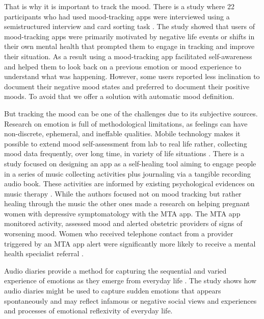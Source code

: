 That is why it is important to track the mood. There is a study where 22 participants who had used mood-tracking apps were interviewed using a semistructured interview and card sorting task \cite{schueller2021understanding}. The study showed that users of mood-tracking apps were primarily motivated by negative life events or shifts in their own mental health that prompted them to engage in tracking and improve their situation. As a result using a mood-tracking app facilitated self-awareness and helped them to look back on a previous emotion or mood experience to understand what was happening. However, some users reported less inclination to document their negative mood states and preferred to document their positive moods. To avoid that we offer a solution with automatic mood definition.

But tracking the mood can be one of the challenges due to its subjective sources. Research on emotion is full of methodological limitations, as feelings can have non-discrete, ephemeral, and ineffable qualities. Mobile technology makes it possible to extend mood self-assessment from lab to real life rather, collecting mood data frequently, over long time, in variety of life situations \cite{khue2015mood}. There is a study focused on designing an app as a self-healing tool aiming to engage people in a series of music collecting activities plus journaling via a tangible recording audio book. These activities are informed by existing psychological evidences on music therapy \cite{WOS:000723951900034}. While the authors focused not on mood tracking but rather healing through the music the other ones made a research on helping pregnant women with depressive symptomatology with the MTA app. The MTA app monitored activity, assessed mood and alerted obstetric providers of signs of worsening mood. Women who received telephone contact from a provider triggered by an MTA app alert were significantly more likely to receive a mental health specialist referral  \cite{hantsoo2018mobile}.

Audio diaries provide a method for capturing the sequential and varied experience of emotions as they emerge from everyday life \cite{cottingham2020capturing}. The study shows how audio diaries might be used to capture sudden emotions that appears spontaneously and may reflect infamous or negative social views and experiences and processes of emotional reflexivity of everyday life.

